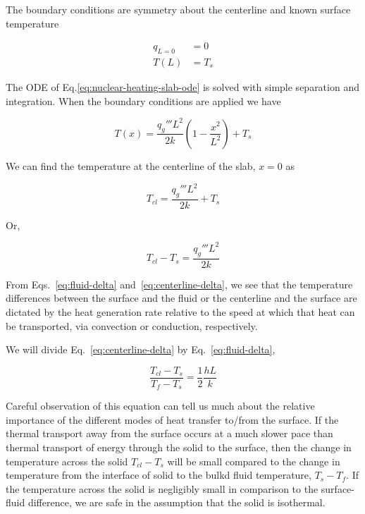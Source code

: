 The boundary conditions are symmetry about the centerline and known surface temperature

\begin{align}
	q_{L=0} &= 0 \\
	T(L) &= T_s
\end{align}

The ODE of Eq.\ref{eq:nuclear-heating-slab-ode} is solved with simple separation and integration. When the boundary conditions are applied we have

\begin{equation}
	T(x) = \frac{q_g''' L^2}{2k}\left(1-\frac{x^2}{L^2}\right) + T_s
\end{equation}

We can find the temperature at the centerline of the slab, $x = 0$ as

\begin{equation}
	T_{cl} = \frac{q_g''' L^2}{2k} + T_s
\end{equation}

Or,

\begin{equation}\label{eq:centerline-delta}
	T_{cl} - T_s = \frac{q_g''' L^2}{2k}
\end{equation}

From Eqs.~\ref{eq:fluid-delta} and~\ref{eq:centerline-delta}, we see that the temperature differences between the surface and the fluid or the centerline and the surface are dictated by the heat generation rate relative to the speed at which that heat can be transported, via convection or conduction, respectively.

We will divide Eq.~\ref{eq:centerline-delta} by Eq.~\ref{eq:fluid-delta},

\begin{equation}\label{eq:biot-derivation}
	\frac{T_{cl} - T_s}{T_f-T_s} = \frac{1}{2}\frac{hL}{k}
\end{equation}

Careful observation of this equation can tell us much about the relative importance of the different modes of heat transfer to/from the surface. If the thermal transport away from the surface occurs at a much slower pace than thermal transport of energy through the solid to the surface, then the change in temperature across the solid $T_{cl}-T_{s}$ will be small compared to the change in temperature from the interface of solid to the bulkd fluid temperature, $T_{s}-T_f$. If the temperature across the solid is negligibly small in comparison to the surface-fluid difference, we are safe in the assumption that the solid is isothermal.

